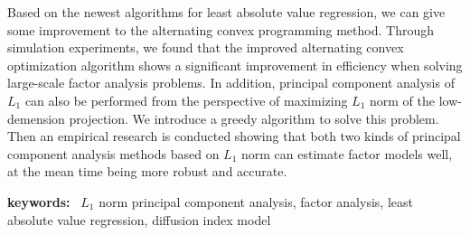 \thispagestyle{plain}

Based on the newest algorithms for least absolute value regression, 
we can give some improvement to the alternating convex programming method.
Through simulation experiments, we found that the improved alternating convex optimization algorithm
shows a significant improvement in efficiency when solving large-scale factor analysis problems. 
In addition, principal component analysis of $L_1$ can also be performed 
from the perspective of maximizing $L_1$ norm of the low-demension projection.
We introduce a greedy algorithm to solve this problem. Then an empirical research is
conducted showing that both two kinds of principal component analysis methods
based on $L_1$ norm can estimate factor models well, 
at the mean time being more robust and accurate.

\vspace{2ex}
{\bf keywords:} \ $L_1$ norm principal component analysis, factor analysis,
least absolute value regression, diffusion index model

\thispagestyle{plain}
\newpage